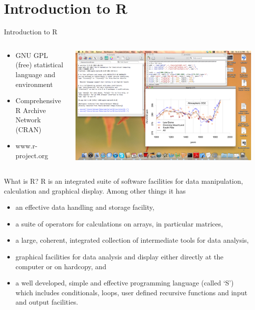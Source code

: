 \documentclass[aspectratio=169]{beamer}\usepackage[]{graphicx}\usepackage[]{color}
\begin{document}
\section{Introduction to R}
\begin{frame}{Introduction to R}
\begin{columns}
	\begin{column}{0.35\textwidth}
		\begin{itemize}
			\item GNU GPL (free) statistical language and environment
			\item Comprehensive R Archive Network (CRAN)
			\item www.r-project.org
		\end{itemize}
	\end{column}
	\begin{column}{0.65\textwidth}
		\begin{center}
			\includegraphics[width=1.0\textwidth]{./images/R_screen.png}
		\end{center}
	\end{column}
\end{columns}
\end{frame}

\begin{frame}{What is R?}
R is an integrated suite of software facilities for data manipulation, calculation and graphical display. Among other things it has
\begin{itemize}
	\item an effective data handling and storage facility,
	\item a suite of operators for calculations on arrays, in particular matrices,
	\item a large, coherent, integrated collection of intermediate tools for data analysis,
	\item graphical facilities for data analysis and display either directly at the computer or on hardcopy, and
	\item a well developed, simple and effective programming language (called `S') which includes conditionals, loops, user defined recursive functions and input and output facilities. 
\end{itemize}
\end{frame}
\end{document}
